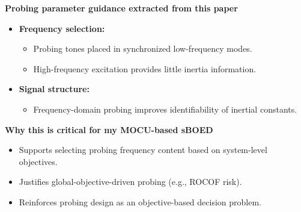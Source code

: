 \documentclass[12pt]{article}
\begin{document}
\textbf{Probing parameter guidance extracted from this paper}
\begin{itemize}
  \item \textbf{Frequency selection:}
  \begin{itemize}
    \item Probing tones placed in synchronized low-frequency modes.
    \item High-frequency excitation provides little inertia information.
  \end{itemize}

  \item \textbf{Signal structure:}
  \begin{itemize}
    \item Frequency-domain probing improves identifiability of inertial constants.
  \end{itemize}
\end{itemize}

\textbf{Why this is critical for my MOCU-based sBOED}
\begin{itemize}
  \item Supports selecting probing frequency content based on system-level objectives.
  \item Justifies global-objective-driven probing (e.g., ROCOF risk).
  \item Reinforces probing design as an objective-based decision problem.
\end{itemize}



\newpage


\end{document}
